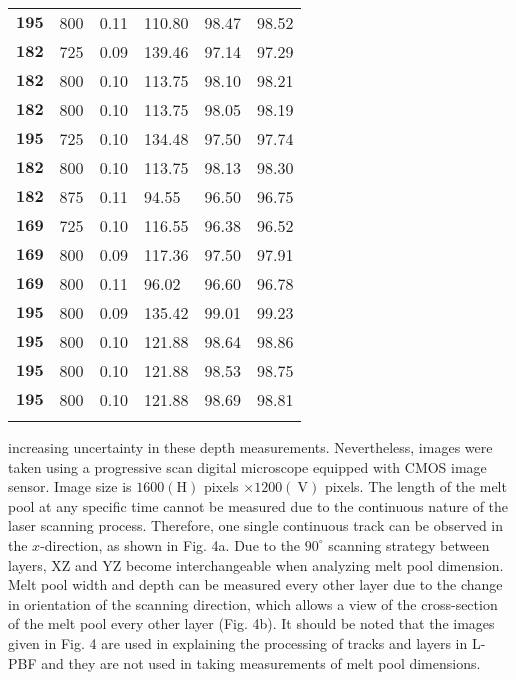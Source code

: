 \documentclass[10pt]{article}
\begin{document}
\begin{center}
\begin{tabular}{llllll}
$\mathbf{1 9 5}$ & 800 & 0.11 & 110.80 & 98.47 & 98.52 \\
$\mathbf{1 8 2}$ & 725 & 0.09 & 139.46 & 97.14 & 97.29 \\
$\mathbf{1 8 2}$ & 800 & 0.10 & 113.75 & 98.10 & 98.21 \\
$\mathbf{1 8 2}$ & 800 & 0.10 & 113.75 & 98.05 & 98.19 \\
$\mathbf{1 9 5}$ & 725 & 0.10 & 134.48 & 97.50 & 97.74 \\
$\mathbf{1 8 2}$ & 800 & 0.10 & 113.75 & 98.13 & 98.30 \\
$\mathbf{1 8 2}$ & 875 & 0.11 & 94.55 & 96.50 & 96.75 \\
$\mathbf{1 6 9}$ & 725 & 0.10 & 116.55 & 96.38 & 96.52 \\
$\mathbf{1 6 9}$ & 800 & 0.09 & 117.36 & 97.50 & 97.91 \\
$\mathbf{1 6 9}$ & 800 & 0.11 & 96.02 & 96.60 & 96.78 \\
$\mathbf{1 9 5}$ & 800 & 0.09 & 135.42 & 99.01 & 99.23 \\
$\mathbf{1 9 5}$ & 800 & 0.10 & 121.88 & 98.64 & 98.86 \\
$\mathbf{1 9 5}$ & 800 & 0.10 & 121.88 & 98.53 & 98.75 \\
$\mathbf{1 9 5}$ & 800 & 0.10 & 121.88 & 98.69 & 98.81 \\
 &  &  &  &  &  \\
\end{tabular}
\end{center}

increasing uncertainty in these depth measurements. Nevertheless, images were taken using a progressive scan digital microscope equipped with CMOS image sensor. Image size is $1600(\mathrm{H})$ pixels $\times 1200(\mathrm{~V})$ pixels. The length of the melt pool at any specific time cannot be measured due to the continuous nature of the laser scanning process. Therefore, one single continuous track can be observed in the $x$-direction, as shown in Fig. 4a. Due to the $90^{\circ}$ scanning strategy between layers, $\mathrm{XZ}$ and $\mathrm{YZ}$ become interchangeable when analyzing melt pool dimension. Melt pool width and depth can be measured every other layer due to the change in orientation of the scanning direction, which allows a view of the cross-section of the melt pool every other layer (Fig. 4b). It should be noted that the images given in Fig. 4 are used in explaining the processing of tracks and layers in L-PBF and they are not used in taking measurements of melt pool dimensions.
\end{document}

